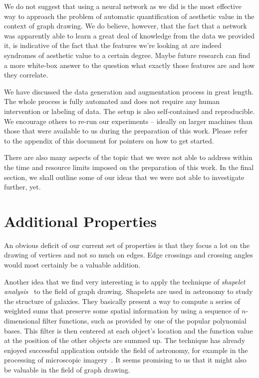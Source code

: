 \documentclass{graphstudy}
\begin{document}
We do not suggest that using a neural network as we did is the most effective way to approach the problem of automatic
quantification of aesthetic value in the context of graph drawing.  We do believe, however, that the fact that a network
was apparently able to learn a great deal of knowledge from the data we provided it, is indicative of the fact that the
features we're looking at are indeed syndromes of aesthetic value to a certain degree.  Maybe future research can find a
more white-box answer to the question what exactly those features are and how they correlate.

We have discussed the data generation and augmentation process in great length.  The whole process is fully automated
and does not require any human intervention or labeling of data.  The setup is also self-contained and reproducible.  We
encourage others to re-run our experiments -- ideally on larger machines than those that were available to us during the
preparation of this work.  Please refer to the appendix of this document for pointers on how to get started.

There are also many aspects of the topic that we were not able to address within the time and resource limits imposed on
the preparation of this work.  In the final section, we shall outline some of our ideas that we were not able to
investigate further, yet.

\section{Additional Properties}

An obvious deficit of our current set of properties is that they focus a lot on the drawing of vertices and not so much
on edges.  Edge crossings and crossing angles would most certainly be a valuable addition.

Another idea that we find very interesting is to apply the technique of \emph{shapelet analysis}~\cite{Refregier2003} to
the field of graph drawing.  Shapelets are used in astronomy to study the structure of galaxies.  They basically present
a way to compute a series of weighted sums that preserve some spatial information by using a sequence of
\(n\)-dimensional filter functions, such as provided by one of the popular polynomial bases.  This filter is then
centered at each object's location and the function value at the position of the other objects are summed up.
The technique has already enjoyed successful application outside the field of astronomy, for example in the processing
of microscopic imagery~\cite{Suderman2014}.  It seems promising to us that it might also be valuable in the field of
graph drawing.
\end{document}
